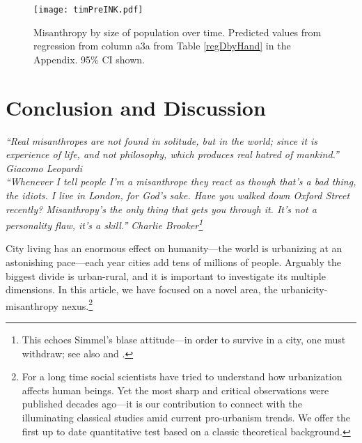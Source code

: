 \documentclass[11pt, letterpaper]{article}
\begin{document}
\begin{spacing}{1.4}
\begin{figure}[H]
  \texttt{[image: timPreINK.pdf]}\centering
\caption{Misanthropy by size of population over time. Predicted values from regression from column a3a
from Table \ref{regDbyHand} in the Appendix. 95\% CI shown.}\label{timPre}%
\end{figure}



\section*{Conclusion and Discussion}

{\small\it \noindent ``Real misanthropes are not found in solitude, but in the world; since
it is experience of life, and not philosophy, which produces real hatred of
mankind.'' Giacomo Leopardi\\

\noindent ``Whenever I tell people I'm a misanthrope they react as though that's a bad thing, the idiots. I live in London, for God's sake. Have you walked down Oxford Street recently? Misanthropy's the only thing that gets you through it. It's not a personality flaw, it's a skill.'' Charlie Brooker\footnote{This echoes Simmel's blase attitude---in order to survive in a city, one must withdraw; see also \citet{milgram70} and \citet{lederbogen11}.}\\}

City living has an enormous effect on humanity---the world is urbanizing at
an astonishing pace---each year cities add tens of millions of people. Arguably the biggest divide is urban-rural, and it is important to investigate its multiple dimensions. In this article, we have focused on a novel area, the urbanicity-misanthropy nexus.\footnote{For a long time social scientists have tried to understand how urbanization affects human beings. Yet the most sharp and critical observations were published decades ago---it is our contribution to connect with the illuminating classical studies amid current pro-urbanism trends. We offer the first up to date quantitative test based on a classic theoretical background.}   
 

\end{spacing}
\end{document}
